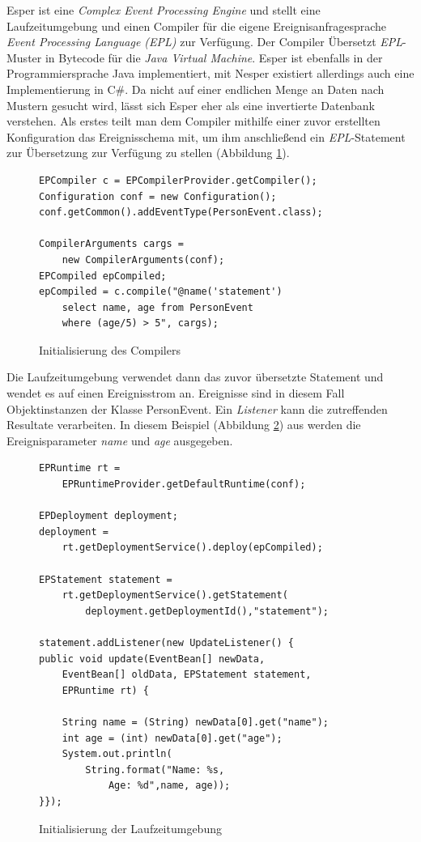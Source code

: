 \documentclass{acm_proc_article-sp}
\begin{document}
Esper ist eine \textit{Complex Event Processing Engine} und stellt eine Laufzeitumgebung 
und einen Compiler für die eigene Ereignisanfragesprache \textit{Event Processing 
Language (EPL)} zur Verfügung. Der Compiler Übersetzt \textit{EPL}-Muster in Bytecode für 
die 
\textit{Java Virtual Machine}. Esper ist ebenfalls in der Programmiersprache Java 
implementiert, mit Nesper existiert allerdings auch eine Implementierung in C\#. Da nicht 
auf einer endlichen Menge an Daten nach Mustern gesucht wird, lässt sich Esper eher als 
eine invertierte Datenbank verstehen. Als erstes teilt man dem Compiler mithilfe einer 
zuvor erstellten Konfiguration das Ereignisschema mit, um ihm anschließend ein 
\textit{EPL}-Statement zur Übersetzung zur Verfügung zu stellen (Abbildung 
\ref{java:01}). 

\begin{figure}[h]    
\begin{verbatim}
EPCompiler c = EPCompilerProvider.getCompiler();
Configuration conf = new Configuration();
conf.getCommon().addEventType(PersonEvent.class);

CompilerArguments cargs = 
    new CompilerArguments(conf);
EPCompiled epCompiled;
epCompiled = c.compile("@name('statement')
    select name, age from PersonEvent
    where (age/5) > 5", cargs);
\end{verbatim}
\caption{Initialisierung des Compilers}
\label{java:01}
\end{figure}

Die Laufzeitumgebung verwendet dann das zuvor übersetzte Statement und wendet es auf 
einen Ereignisstrom an. Ereignisse sind in diesem Fall Objektinstanzen der Klasse 
PersonEvent. Ein \textit{Listener} kann die zutreffenden Resultate verarbeiten. In 
diesem Beispiel (Abbildung \ref{java:02}) aus \cite{esper-reference} werden die 
Ereignisparameter \textit{name} und \textit{age} ausgegeben.

\begin{figure}[h]    
\begin{verbatim}
EPRuntime rt =
    EPRuntimeProvider.getDefaultRuntime(conf);
    
EPDeployment deployment;
deployment =
    rt.getDeploymentService().deploy(epCompiled);
    
EPStatement statement =         
    rt.getDeploymentService().getStatement(
        deployment.getDeploymentId(),"statement");
        
statement.addListener(new UpdateListener() {
public void update(EventBean[] newData,
    EventBean[] oldData, EPStatement statement,
    EPRuntime rt) {
    
    String name = (String) newData[0].get("name");
    int age = (int) newData[0].get("age");
    System.out.println(
        String.format("Name: %s,
            Age: %d",name, age));
}});
\end{verbatim}
    \caption{Initialisierung der Laufzeitumgebung}
    \label{java:02}
\end{figure}
\end{document}
